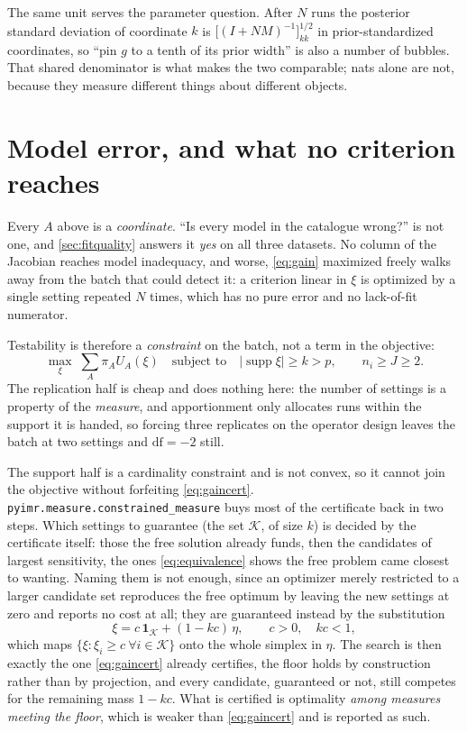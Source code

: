 \documentclass[10pt]{article}
\begin{document}
The same unit serves the parameter question. After $N$ runs the posterior standard deviation of
coordinate $k$ is $\big[(I + NM)^{-1}\big]_{kk}^{1/2}$ in prior-standardized coordinates, so
``pin $g$ to a tenth of its prior width'' is also a number of bubbles. That shared denominator
is what makes the two comparable; nats alone are not, because they measure different things
about different objects.

\section{Model error, and what no criterion reaches}

Every $A$ above is a \emph{coordinate}. ``Is every model in the catalogue wrong?'' is not one,
and \cref{sec:fitquality} answers it \emph{yes} on all three datasets. No column of the Jacobian
reaches model inadequacy, and worse, \eqref{eq:gain} maximized freely walks away from the batch
that could detect it: a criterion linear in $\xi$ is optimized by a single setting repeated $N$
times, which has no pure error and no lack-of-fit numerator.

Testability is therefore a \emph{constraint} on the batch, not a term in the objective:
%
\begin{equation}
\max_\xi \;\sum_A \pi_A U_A(\xi)
\quad\text{subject to}\quad
\lvert\operatorname{supp}\xi\rvert \ge k > p, \qquad n_i \ge J \ge 2 .
\label{eq:constrained}
\end{equation}
%
The replication half is cheap and does nothing here: the number of settings is a property of
the \emph{measure}, and apportionment only allocates runs within the support it is handed, so
forcing three replicates on the operator design leaves the batch at two settings and
$\mathrm{df} = -2$ still.

The support half is a cardinality constraint and is not convex, so it cannot join the objective
without forfeiting \eqref{eq:gaincert}. \texttt{pyimr.measure.constrained\_measure} buys most of
the certificate back in two steps. Which settings to guarantee (the set $\mathcal{K}$,
of size $k$) is decided by the certificate itself: those the free solution already funds,
then the candidates of largest sensitivity, the ones \eqref{eq:equivalence} shows the free
problem came closest to wanting. Naming them is
not enough, since an optimizer merely restricted to a larger candidate set reproduces the free
optimum by leaving the new settings at zero and reports no cost at all; they are guaranteed
instead by the substitution
%
\begin{equation}
\xi = c\,\mathbf{1}_{\mathcal{K}} + (1 - kc)\,\eta ,
\qquad c > 0, \quad kc < 1 ,
\label{eq:floorsub}
\end{equation}
%
which maps $\{\xi : \xi_i \ge c \ \forall i \in \mathcal{K}\}$ onto the whole simplex in $\eta$.
The search is then exactly the one \eqref{eq:gaincert} already certifies, the floor holds by
construction rather than by projection, and every candidate, guaranteed or not, still
competes for the remaining mass $1 - kc$. What is certified is optimality \emph{among measures
meeting the floor}, which is weaker than \eqref{eq:gaincert} and is reported as such.
\end{document}
